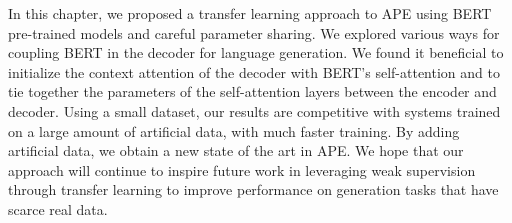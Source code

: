 In this chapter, we proposed a transfer learning approach to APE
using BERT pre-trained models and careful parameter sharing. We
explored various ways for coupling BERT in the decoder for language
generation. We found it beneficial to initialize the context
attention of the decoder with BERT's self-attention and to tie
together the parameters of the self-attention layers between the
encoder and decoder. Using a small dataset, our results are
competitive with systems trained on a large amount of artificial
data, with much faster training. By adding artificial data, we obtain
a new state of the art in APE. We hope that our approach will
continue to inspire future work in leveraging weak supervision
through transfer learning to improve performance on generation tasks
that have scarce real data.

\cleardoublepage

\singlespacing
